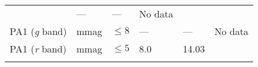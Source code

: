 \documentclass[DM,toc]{lsstdoc}
\begin{document}
\begin{longtable}[]{@{}llllll@{}}
\begin{minipage}[t]{0.17\columnwidth}
\end{minipage} & \begin{minipage}[t]{0.17\columnwidth}\raggedright\strut
---\strut
\end{minipage} & \begin{minipage}[t]{0.12\columnwidth}\raggedright\strut
---\strut
\end{minipage} & \begin{minipage}[t]{0.17\columnwidth}\raggedright\strut
No data\strut
\end{minipage}\tabularnewline
\begin{minipage}[t]{0.14\columnwidth}\raggedright\strut
PA1 (\emph{g} band)\strut
\end{minipage} & \begin{minipage}[t]{0.06\columnwidth}\raggedright\strut
mmag\strut
\end{minipage} & \begin{minipage}[t]{0.17\columnwidth}\raggedright\strut
\(\leq 8\)\strut
\end{minipage} & \begin{minipage}[t]{0.17\columnwidth}\raggedright\strut
---\strut
\end{minipage} & \begin{minipage}[t]{0.12\columnwidth}\raggedright\strut
---\strut
\end{minipage} & \begin{minipage}[t]{0.17\columnwidth}\raggedright\strut
No data\strut
\end{minipage}\tabularnewline
\begin{minipage}[t]{0.14\columnwidth}\raggedright\strut
PA1 (\emph{r} band)\strut
\end{minipage} & \begin{minipage}[t]{0.06\columnwidth}\raggedright\strut
mmag\strut
\end{minipage} & \begin{minipage}[t]{0.17\columnwidth}\raggedright\strut
\(\leq 5\)\strut
\end{minipage} & \begin{minipage}[t]{0.17\columnwidth}\raggedright\strut
8.0\strut
\end{minipage} & \begin{minipage}[t]{0.12\columnwidth}\raggedright\strut
14.03\strut
\end{minipage} & \begin{minipage}[t]{0.17\columnwidth}\raggedright\strut
\strut
\end{minipage}\tabularnewline
\begin{minipage}[t]{0.14\columnwidth}\raggedright\strut

\end{minipage}
\end{longtable}
\end{document}
